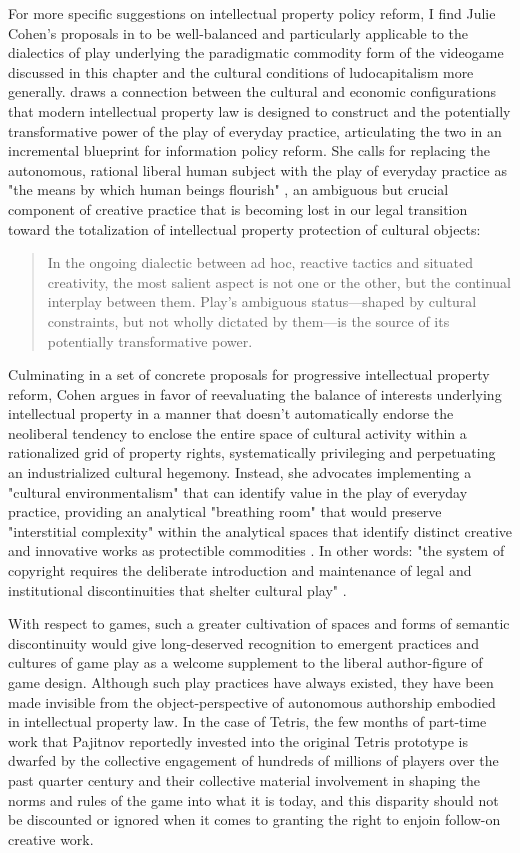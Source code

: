 For more specific suggestions on intellectual property policy reform, I find Julie Cohen's proposals in  to be well-balanced and particularly applicable to the dialectics of play underlying the paradigmatic commodity form of the videogame discussed in this chapter and the cultural conditions of ludocapitalism more generally. \citeauthor{Cohen2012} draws a connection between the cultural and economic configurations that modern intellectual property law is designed to construct and the potentially transformative power of the play of everyday practice, articulating the two in an incremental blueprint for information policy reform. She calls for replacing the autonomous, rational liberal human subject with the play of everyday practice as "the means by which human beings flourish" \autocite[56]{Cohen2012}, an ambiguous but crucial component of creative practice that is becoming lost in our legal transition toward the totalization of intellectual property protection of cultural objects:
\blockcquote[55]{Cohen2012}{
  In the ongoing dialectic between ad hoc, reactive tactics and situated creativity, the most salient aspect is not one or the other, but the continual interplay between them. Play's ambiguous status---shaped by cultural constraints, but not wholly dictated by them---is the source of its potentially transformative power.
  }
Culminating in a set of concrete proposals for progressive intellectual property reform, Cohen argues in favor of reevaluating the balance of interests underlying intellectual property in a manner that doesn't automatically endorse the neoliberal tendency to enclose the entire space of cultural activity within a rationalized grid of property rights, systematically privileging and perpetuating an industrialized cultural hegemony. Instead, she advocates implementing a "cultural environmentalism" that can identify value in the play of everyday practice, providing an analytical "breathing room" that would preserve "interstitial complexity" within the analytical spaces that identify distinct creative and innovative works as protectible commodities \autocite[248]{Cohen2012}. In other words: "the system of copyright requires the deliberate introduction and maintenance of legal and institutional discontinuities that shelter cultural play" \autocite[240]{Cohen2012}.

With respect to games, such a greater cultivation of spaces and forms of semantic discontinuity would give long-deserved recognition to emergent practices and cultures of game play as a welcome supplement to the liberal author-figure of game design. Although such play practices have always existed, they have been made invisible from the object-perspective of autonomous authorship embodied in intellectual property law. In the case of Tetris, the few months of part-time work that Pajitnov reportedly invested into the original Tetris prototype is dwarfed by the collective engagement of hundreds of millions of players over the past quarter century and their collective material involvement in shaping the norms and rules of the game into what it is today, and this disparity should not be discounted or ignored when it comes to granting the right to enjoin follow-on creative work.

